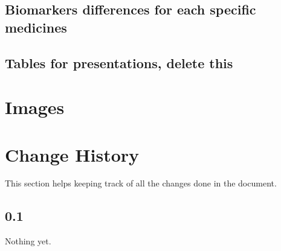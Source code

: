 \documentclass[10pt, a4paper, onecolumn]{article} %
\begin{document}
	

\subsection{Biomarkers differences for each specific medicines}





\subsection{Tables for presentations, delete this}





\newpage


\section{Images}

%	

%	

%

%

\newpage

\section{Change History}

This section helps keeping track of all the changes done in the document.\\

\subsection*{0.1}

Nothing yet.\\
\end{document}
